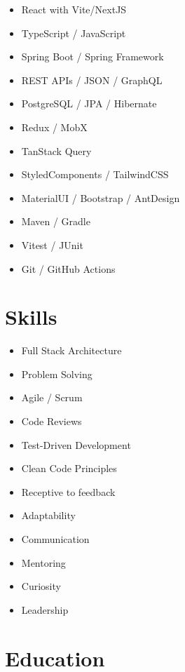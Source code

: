 \documentclass[11pt,a4paper,sans]{moderncv}
\begin{document}
\vspace{10pt}

\begin{multicols}{2}
\begin{itemize}
  \item React with Vite/NextJS
  \item TypeScript / JavaScript
  \item Spring Boot / Spring Framework
  \item REST APIs / JSON / GraphQL
  \item PostgreSQL / JPA / Hibernate
  \item Redux / MobX
  \item TanStack Query 
  \item StyledComponents / TailwindCSS
  \item MaterialUI / Bootstrap / AntDesign
  \item Maven / Gradle
  \item Vitest / JUnit
  \item Git / GitHub Actions
\end{itemize}
\end{multicols}

\section{Skills}

\vspace{10pt}

\begin{multicols}{2}
\begin{itemize}
  \item Full Stack Architecture
  \item Problem Solving
  \item Agile / Scrum
  \item Code Reviews
  \item Test-Driven Development
  \item Clean Code Principles
  \item Receptive to feedback
  \item Adaptability
  \item Communication
  \item Mentoring
  \item Curiosity
  \item Leadership
\end{itemize}
\end{multicols}

\section{Education}
\end{document}
